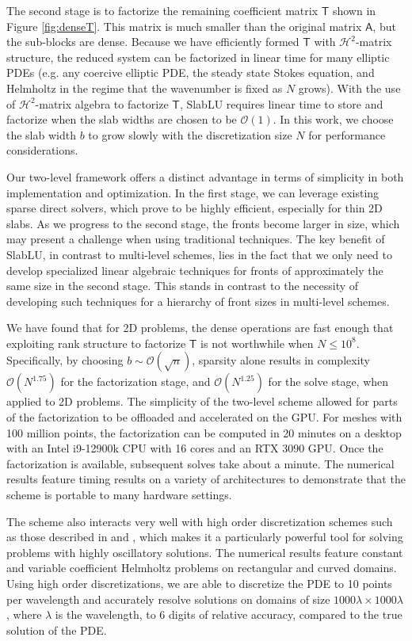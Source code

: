 \documentclass[11pt]{amsart}
\newcommand{\mtx}[1]{\bm{\mathsf{#1}}}
\begin{document}
The second stage is to factorize the remaining coefficient matrix $\mtx{T}$
shown in Figure \ref{fig:denseT}. This matrix is much smaller than the original
matrix $\mtx{A}$, but the sub-blocks are dense. Because we have efficiently formed
$\mtx T$ with $\mathcal H^2$-matrix structure, the reduced system can be
factorized in linear time for many elliptic PDEs (e.g. any coercive elliptic PDE, the steady state Stokes equation, and Helmholtz in the regime that the wavenumber is fixed as $N$ grows). 
With the use of $\mathcal H^2$-matrix algebra to factorize $\mtx T$, SlabLU requires linear time to 
store and factorize when the slab widths are chosen to be $\mathcal O(1)$.
In this work, we choose the slab width $b$ to grow slowly with the discretization size $N$
for performance considerations.

Our two-level framework offers a distinct advantage in terms of simplicity in both implementation and optimization. In the first stage,
we can leverage existing sparse direct solvers, which prove to be highly efficient, especially for thin 2D slabs. 
As we progress to the second stage, the fronts become larger in size, which may present a challenge when using traditional techniques.
The key benefit of SlabLU, in contrast to multi-level schemes, lies in the fact that we only need to develop specialized linear 
algebraic techniques for fronts of approximately the same size in the second stage. 
This stands in contrast to the necessity of developing such techniques for a hierarchy of front sizes in multi-level schemes.

We have found that for 2D problems, the dense 
operations are fast enough that exploiting rank structure to factorize $\mtx T$ is not
worthwhile when $N \leq 10^8$. 
Specifically, by choosing $b \sim \mathcal O(\sqrt{n})$, sparsity alone results in complexity $\mathcal O(N^{1.75})$ for the factorization stage, and $\mathcal O(N^{1.25})$ for the solve stage, when applied to 2D problems.
The simplicity of the two-level scheme allowed for parts of the factorization to 
be offloaded and accelerated on the GPU.
For meshes with 100 million points, the factorization can
be computed in 20 minutes on a desktop with an Intel i9-12900k CPU with 16 cores and an RTX 3090 GPU.
Once the factorization is available, subsequent solves take about a minute.
The numerical results feature timing results on a variety of architectures
to demonstrate that the scheme is portable to many hardware settings.

The scheme also interacts very well with high order discretization schemes such as those
described in \cite{2012_spectralcomposite} and \cite[Ch.~25]{2019_martinsson_book},
which makes it a particularly powerful tool for solving problems with highly oscillatory solutions.
The numerical results feature constant and variable coefficient 
Helmholtz problems on rectangular and curved domains. Using high order discretizations, we are able to 
discretize the PDE to 10 points per wavelength and accurately resolve
solutions on domains of size
$1000\lambda \times 1000\lambda$, where $\lambda$ is the wavelength,
to 6 digits of relative accuracy, compared to the true solution of the PDE. 
\end{document}
